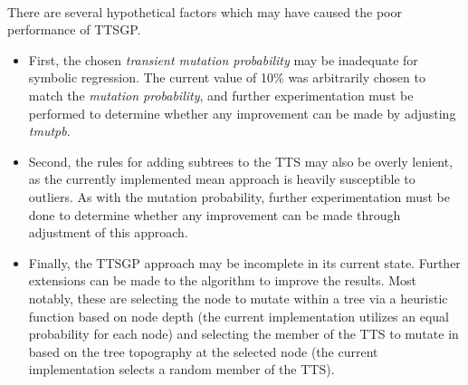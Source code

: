 \documentclass[a4paper]{article}
\begin{document}
\paragraph{} There are several hypothetical factors which may have caused the poor performance of TTSGP. 
\begin{itemize}
	\item First, the chosen \textit{transient mutation probability} may be inadequate for symbolic regression. The current value of 10\% was arbitrarily chosen to match the \textit{mutation probability}, and further experimentation must be performed to determine whether any improvement can be made by adjusting \textit{tmutpb}. 
	\item Second, the rules for adding subtrees to the TTS may also be overly lenient, as the currently implemented mean approach is heavily susceptible to outliers. As with the mutation probability, further experimentation must be done to determine whether any improvement can be made through adjustment of this approach. 
	\item Finally, the TTSGP approach may be incomplete in its current state. Further extensions can be made to the algorithm to improve the results. Most notably, these are selecting the node to mutate within a tree via a heuristic function based on node depth (the current implementation utilizes an equal probability for each node) and selecting the member of the TTS to mutate in based on the tree topography at the selected node (the current implementation selects a random member of the TTS).
\end{itemize}

\end{document}
